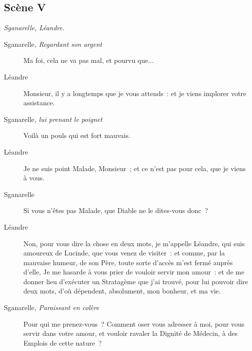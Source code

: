 \documentclass[french,twoside]{book} %
\begin{document}
\subsection[{Scène V}]{Scène V}
\label{II05}
\textit{Sganarelle, Léandre.}\par
 \begin{description} \item[Sganarelle\textit{, Regardant son argent}\par
] 

Ma foi, cela ne va pas mal, et pourvu que...\end{description}
 \begin{description} \item[Léandre] 

Monsieur, il y a longtemps que je vous attends : et je viens implorer votre assistance.\end{description}
 \begin{description} \item[Sganarelle\textit{, lui prenant le poignet}\par
] 

Voilà un pouls qui est fort mauvais.\end{description}
 \begin{description} \item[Léandre] 

Je ne suis point Malade, Monsieur ; et ce n’est pas pour cela, que je viens à vous.\end{description}
 \begin{description} \item[Sganarelle] 

Si vous n’êtes pas Malade, que Diable ne le dites-vous donc ?\end{description}
 \begin{description} \item[Léandre] 

Non, pour vous dire la chose en deux mots, je m’appelle Léandre, qui suis amoureux de Lucinde, que vous venez de visiter : et comme, par la mauvaise humeur, de son Père, toute sorte d’accès m’est fermé auprès d’elle, Je me hasarde à vous prier de vouloir servir mon amour : et de me donner lieu d’exécuter un Stratagème que j’ai trouvé, pour lui pouvoir dire deux mots, d’où dépendent, absolument, mon bonheur, et ma vie.\end{description}
 \begin{description} \item[Sganarelle\textit{, Paraissant en colère}\par
] 

Pour qui me prenez-vous ? Comment oser vous adresser à moi, pour vous servir dans votre amour, et vouloir ravaler la Dignité de Médecin, à des Emplois de cette nature ?\end{description}
\end{document}
